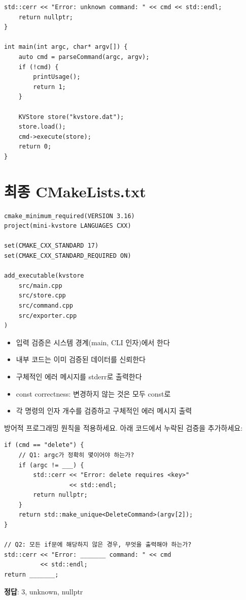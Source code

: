 \documentclass[11pt,a4paper]{book}
\newcommand{\file}[1]{\texttt{#1}}
\begin{document}
\begin{lstlisting}[style=cpp,title={\file{src/main.cpp} (최종)}]
    std::cerr << "Error: unknown command: " << cmd << std::endl;
    return nullptr;
}

int main(int argc, char* argv[]) {
    auto cmd = parseCommand(argc, argv);
    if (!cmd) {
        printUsage();
        return 1;
    }

    KVStore store("kvstore.dat");
    store.load();
    cmd->execute(store);
    return 0;
}
\end{lstlisting}

\section{최종 CMakeLists.txt}

\begin{lstlisting}[style=cmake,title={\file{CMakeLists.txt} (최종)}]
cmake_minimum_required(VERSION 3.16)
project(mini-kvstore LANGUAGES CXX)

set(CMAKE_CXX_STANDARD 17)
set(CMAKE_CXX_STANDARD_REQUIRED ON)

add_executable(kvstore
    src/main.cpp
    src/store.cpp
    src/command.cpp
    src/exporter.cpp
)
\end{lstlisting}

\begin{summarybox}
\begin{itemize}[nosep]
\item 입력 검증은 시스템 경계(main, CLI 인자)에서 한다
\item 내부 코드는 이미 검증된 데이터를 신뢰한다
\item 구체적인 에러 메시지를 stderr로 출력한다
\item const correctness: 변경하지 않는 것은 모두 const로
\item 각 명령의 인자 개수를 검증하고 구체적인 에러 메시지 출력
\end{itemize}
\end{summarybox}

\begin{quizbox}
방어적 프로그래밍 원칙을 적용하세요. 아래 코드에서 누락된 검증을 추가하세요:

\begin{lstlisting}[style=cpp,numbers=none]
if (cmd == "delete") {
    // Q1: argc가 정확히 몇이어야 하는가?
    if (argc != ___) {
        std::cerr << "Error: delete requires <key>"
                  << std::endl;
        return nullptr;
    }
    return std::make_unique<DeleteCommand>(argv[2]);
}

// Q2: 모든 if문에 해당하지 않은 경우, 무엇을 출력해야 하는가?
std::cerr << "Error: _______ command: " << cmd
          << std::endl;
return _______;
\end{lstlisting}

\textbf{정답}: 3, unknown, nullptr
\end{quizbox}
\end{document}
